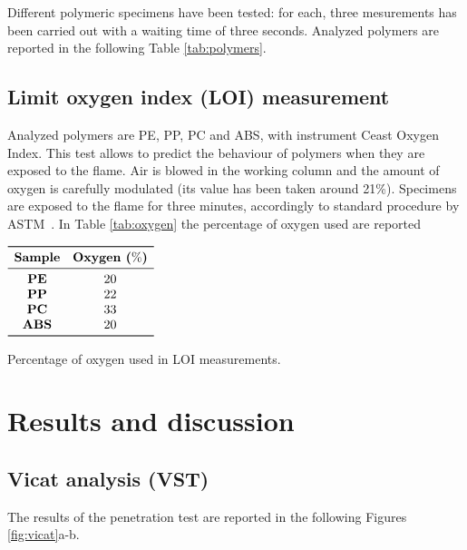 \documentclass[a4paper, 11pt]{article}
\begin{document}
Different polymeric specimens have been tested: for each, three mesurements has been carried out with a waiting time of three seconds. Analyzed polymers are reported in the following Table \ref{tab:polymers}.

\subsection{Limit oxygen index (LOI) measurement}

Analyzed polymers are PE, PP, PC and ABS, with instrument Ceast Oxygen Index. This test allows to predict the behaviour of polymers when they are exposed to the flame. Air is blowed in the working column and the amount of oxygen is carefully modulated (its value has been taken around 21\%). Specimens are exposed to the flame for three minutes, accordingly to standard procedure by ASTM~\cite{LOI}. In Table \ref{tab:oxygen} the percentage of oxygen used are reported
\begin{table}[htp]
	\centering
	$
	\begin{array}{cc}
	\toprule
	\textbf{Sample} & \textbf{Oxygen ($\%$)}\\
	\midrule
	\textbf{PE} & 20 \\
	\textbf{PP} & 22\\
	\textbf{PC} & 33 \\
	\textbf{ABS} & 20\\
	\bottomrule
	\end{array}
	$
	\caption{Percentage of oxygen used in LOI measurements.}
	\label{tab:oxygen}
\end{table}

\newpage

\section{Results and discussion}

\subsection{Vicat analysis (VST)}

The results of the penetration test are reported in the following Figures \ref{fig:vicat}a-b.
\end{document}
